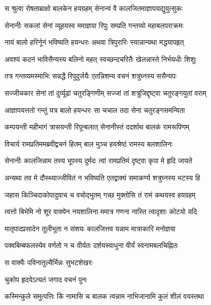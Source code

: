 \twolineshloka
{स श्रुत्वा रोषताम्राक्षो बालकेन हयग्रहम्}
{सेनान्यं वै कालजितमाज्ञापयद्युयुत्सुकः}%

\twolineshloka
{सेनानीः सकलां सेनां व्यूहयस्व ममाज्ञया}
{रिपुः सम्प्रति गन्तव्यो महाबलपराक्रमः}%

\twolineshloka
{नायं बालो हरिर्नूनं भविष्यति हयन्धरः}
{अथवा त्रिपुरारिः स्यान्नान्यथा मद्धयापहृत्}%

\twolineshloka
{अवश्यं कदनं भाविसैन्यस्य बलिनो महत्}
{स्वच्छन्दचरितैः खेलन्नास्ते निर्भयधीः शिशुः}%

\twolineshloka
{तत्र गन्तव्यमस्माभिः सन्नद्धै रिपुदुर्जयैः}
{एतन्निशम्य वचनं शत्रुघ्नस्य ससैन्यपः}%

\twolineshloka
{सज्जीचकार सेनां तां दुर्व्यूढां चतुरङ्गिणीम्}
{सज्जां तां शत्रुजिद्दृष्ट्वा चतुरङ्गयुतां वराम्}%

\twolineshloka
{आज्ञापयत्ततो गन्तुं यत्र बालो हयन्धरः}
{सा चचाल तदा सेना चतुरङ्गसमन्विता}%

\twolineshloka
{कम्पयन्ती महीभागं त्रासयन्ती रिपून्बलात्}
{सेनानीस्तं ददर्शाथ बालकं रामरूपिणम्}%

\twolineshloka
{विचार्य रामप्रतिममब्रवीद्वचनं हितम्}
{बाल मुञ्च हयश्रेष्ठं रामस्य बलशालिनः}%

\twolineshloka
{सेनानीः कालजिन्नाम तस्य भूपस्य दुर्मदः}
{त्वां रामप्रतिमं दृष्ट्वा कृपा मे हृदि जायते}%

\twolineshloka
{अन्यथा तव मे दौस्थ्याज्जीवितं न भविष्यति}
{एतद्वाक्यं समाकर्ण्य शत्रुघ्नस्य भटस्य हि}%

\twolineshloka
{जहास किञ्चिदाकोपादुवाच च वचोद्भुतम्}
{गच्छ मुक्तोसि तं रामं कथयस्व हयग्रहम्}%

\twolineshloka
{त्वत्तो बिभेमि नो शूर वाक्येन नयशालिना}
{ममात्र गणना नास्ति त्वादृशाः कोटयो यदि}%

\twolineshloka
{मातृपादप्रसादेन तूलीभूता न संशयः}
{कालजित्तव यन्नाम मात्राकारि मनोज्ञया}%

\twolineshloka
{पक्वबिम्बफलस्येव वर्णतो न च वीर्यतः}
{दर्शयस्वाधुना वीर्यं स्वनामबलचिह्नितः}%



\onelineshloka
{स वाक्यैः पविनातुल्यैर्भिन्नः सुभटशेखरः}%

चुकोप हृदयेऽत्यतं जगाद वचनं पुनः

\twolineshloka
{कस्मिन्कुले समुत्पत्तिः किं नामासि च बालक}
{त्वन्नाम नाभिजानामि कुलं शीलं वयस्तथा}%

